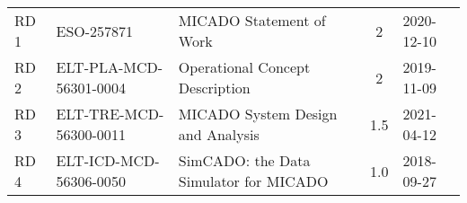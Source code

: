 \begin{center}
  \tabletail{\hline}

  \begin{supertabular}{|l|l|l|c|l|}
    \hline
    RD\,1 & ESO-257871 & MICADO Statement of Work & 2 & 2020-12-10  \\
    RD\,2 & ELT-PLA-MCD-56301-0004 & Operational Concept Description &
    2 & 2019-11-09 \\
    RD\,3 & ELT-TRE-MCD-56300-0011 & MICADO System Design and Analysis & 1.5 &
    2021-04-12 \\
    RD\,4 & ELT-ICD-MCD-56306-0050 & SimCADO: the Data Simulator for MICADO & 1.0 & 2018-09-27 \\

  \end{supertabular}
\end{center}